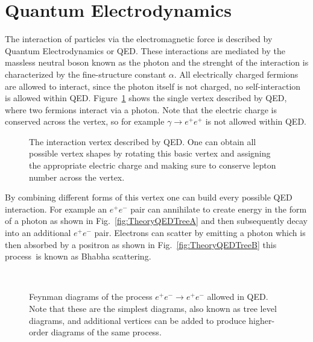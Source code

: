 \section{Quantum Electrodynamics}

The interaction of particles via the electromagnetic force is described by Quantum Electrodynamics or QED. These interactions are mediated by the massless neutral boson known as the photon and the strenght of the interaction is characterized by the fine-structure constant $\alpha$. All electrically charged fermions are allowed to interact, since the photon itself is not charged, no self-interaction is allowed within QED. Figure~\ref{fig:TheorySimpleQED} shows the single vertex described by QED, where two fermions interact via a photon. Note that the electric charge is conserved across the vertex, so for example $\gamma\rightarrow e^{+}e^{+}$ is not allowed within QED.

\begin{figure}
  \centering
  
  \caption{The interaction vertex described by QED. One can obtain all possible vertex shapes by rotating this basic vertex and assigning the appropriate electric charge and making sure to conserve lepton number across the vertex.} \label{fig:TheorySimpleQED}
\end{figure}

By combining different forms of this vertex one can build every possible QED interaction. For example an $e^{+}e^{-}$ pair can annihilate to create energy in the form of a photon as shown in Fig.~\ref{fig:TheoryQEDTreeA} and then subsequently decay into an additional $e^{+}e^{-}$ pair. Electrons can scatter by emitting a photon which is then absorbed by a positron as shown in Fig.~\ref{fig:TheoryQEDTreeB} this process is known as Bhabha scattering.

\begin{figure}
  \centering
  \begin{minipage}[][][t]{.47\textwidth}
    \centering
    
     \label{fig:TheoryQEDTreeA}
  \end{minipage}
  \,
  \begin{minipage}[][][t]{.47\textwidth}
    \centering
    
     \label{fig:TheoryQEDTreeB}
  \end{minipage}
  \caption{Feynman diagrams of the process $e^{+}e^{-}\rightarrow e^{+}e^{-}$ allowed in QED. Note that these are the simplest diagrams, also known as tree level diagrams, and additional vertices can be added to produce higher-order diagrams of the same process.}
  \label{fig:TheoryQEDTree}
\end{figure}

